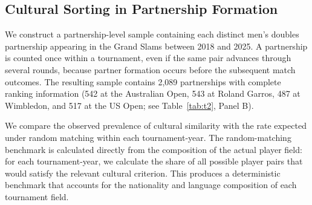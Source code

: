\documentclass[10pt]{article}
\begin{document}
\subsection{Cultural Sorting in Partnership Formation}
\label{sec:sorting}


We construct a partnership-level sample containing each distinct men's doubles partnership appearing in the Grand Slams between 2018 and 2025. A partnership is counted once within a tournament, even if the same pair advances through several rounds, because partner formation occurs before the subsequent match outcomes. The resulting sample contains 2,089 partnerships with complete ranking information (542 at the Australian Open, 543 at Roland Garros, 487 at Wimbledon, and 517 at the US Open; see Table~\ref{tab:t2}, Panel B).

We compare the observed prevalence of cultural similarity with the rate expected under random matching within each tournament-year. The random-matching benchmark is calculated directly from the composition of the actual player field: for each tournament-year, we calculate the share of all possible player pairs that would satisfy the relevant cultural criterion. This produces a deterministic benchmark that accounts for the nationality and language composition of each tournament field.
\end{document}
